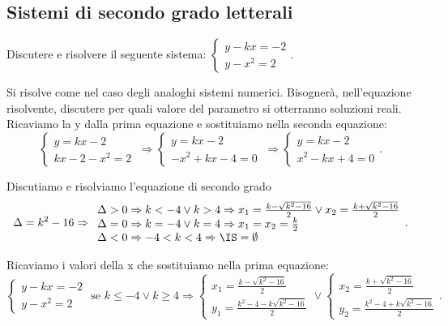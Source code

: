 \subsection{Sistemi di secondo grado letterali}
\begin{exrig}
\begin{esempio}
Discutere e risolvere il seguente sistema: $\left\{\begin{array}{l}y-kx=-2\\y-x^2=2\end{array}\right.$.

Si risolve come nel caso degli analoghi sistemi numerici. Bisognerà, nell'equazione risolvente, discutere per quali valore del parametro si otterranno soluzioni reali. Ricaviamo la y dalla prima equazione e sostituiamo nella seconda equazione:
\[ \left\{\begin{array}{l}y=kx-2\\kx-2-x^2=2\end{array}\right.\ \Rightarrow\left\{\begin{array}{l}y=kx-2\\-x^2+kx-4=0\end{array}\right.\ \Rightarrow\left\{\begin{array}{l}y=kx-2\\x^2-kx+4=0\end{array}\right.. \]

Discutiamo e risolviamo l'equazione di secondo grado 
\[ \Delta =k^2-16 \Rightarrow
\begin{array}{l}\Delta >0\Rightarrow k<-4\vee k>4\Rightarrow x_1=\frac{k-\sqrt{k^2-16}} 2\vee x_2=\frac{k+\sqrt{k^2-16}} 2\\
\Delta =0\Rightarrow k=-4\vee k=4\Rightarrow x_1=x_2=\frac k 2 \\
\Delta <0\Rightarrow -4<k<4\Rightarrow \IS=\emptyset \end{array}. \]

Ricaviamo i valori della x che sostituiamo nella prima equazione: \[ \left\{\begin{array}{l}y-kx=-2\\y-x^2=2\end{array}\right.\text{ se }k\le -4\vee k\ge 4\Rightarrow \left\{\begin{array}{l}x_1=\frac{k-\sqrt{k^2-16}} 2 \\y_1=\frac{k^2-4-k\sqrt{k^2-16}} 2\end{array}\right.\vee \left\{\begin{array}{l}x_2=\frac{k+\sqrt{k^2-16}} 2 \\y_2=\frac{k^2-4+k\sqrt{k^2-16}} 2\end{array}\right.. \]
\end{esempio}
\end{exrig}


